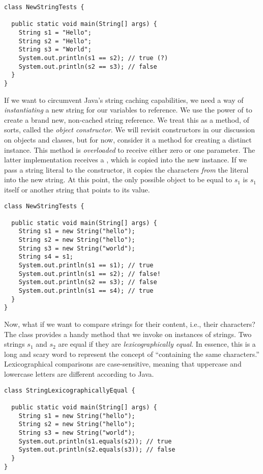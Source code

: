 \begin{lstlisting}[language=MyJava]
class NewStringTests {

  public static void main(String[] args) {
    String s1 = "Hello";
    String s2 = "Hello";
    String s3 = "World";
    System.out.println(s1 == s2); // true (?)
    System.out.println(s2 == s3); // false
  }
}
\end{lstlisting}

If we want to circumvent Java's string caching capabilities, we need a way of \emph{instantiating} a new string for our variables to reference. We use the power of  to create a brand new, non-cached string reference. We treat this as a method, of sorts, called the \emph{object constructor}. We will revisit constructors in our discussion on objects and classes, but for now, consider it a method for creating a distinct  instance. This method is \emph{overloaded} to receive either zero or one parameter. The latter implementation receives a , which is copied into the new  instance. If we pass a string literal to the constructor, it copies the characters \emph{from} the literal into the new string. At this point, the only possible object to be equal to $s_1$ is $s_1$ itself or another string that points to its value.

\begin{lstlisting}[language=MyJava]
class NewStringTests {

  public static void main(String[] args) {
    String s1 = new String("hello");
    String s2 = new String("hello");
    String s3 = new String("world");
    String s4 = s1;
    System.out.println(s1 == s1); // true
    System.out.println(s1 == s2); // false!
    System.out.println(s2 == s3); // false
    System.out.println(s1 == s4); // true
  }
}
\end{lstlisting}

Now, what if we want to compare strings for their content, i.e., their characters? The  class provides a handy  method that we invoke on instances of strings. Two strings $s_1$ and $s_2$ are equal if they are \emph{lexicographically equal}. In essence, this is a long and scary word to represent the concept of ``containing the same characters.'' Lexicographical comparisons are case-sensitive, meaning that uppercase and lowercase letters are different according to Java.

\begin{lstlisting}[language=MyJava]
class StringLexicographicallyEqual {

  public static void main(String[] args) {
    String s1 = new String("hello");
    String s2 = new String("hello");
    String s3 = new String("world");
    System.out.println(s1.equals(s2)); // true
    System.out.println(s2.equals(s3)); // false
  }
}
\end{lstlisting}

